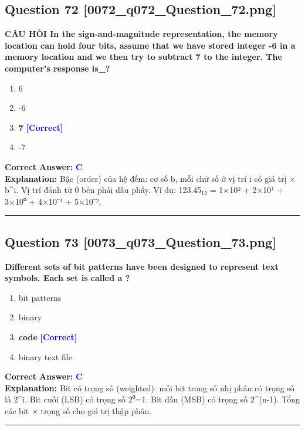 \documentclass[11pt,a4paper]{article}
\begin{document}
\begin{minipage}{\textwidth}
\subsection*{Question 72 \quad \footnotesize{[0072\_q072\_Question\_72.png]}}
\noindent \textbf{CÅU HÒI In the sign-and-magnitude representation, the memory location can hold four bits, assume that we have stored integer -6 in a memory location and we then try to subtract 7 to the integer. The computer's response is\_?}

\begin{enumerate}[label=\Alph*.]
    \item 6
    \item -6
    \item \textbf{7} \hfill \textcolor{blue}{\textbf{[Correct]}}
    \item -7
\end{enumerate}

\noindent \textbf{Correct Answer:} \textcolor{blue}{\textbf{C}} \\[2pt]
\noindent \textbf{Explanation:} Bậc (order) của hệ đếm: cơ số b, mỗi chữ số ở vị trí i có giá trị × b\textasciicircum{}i. Vị trí đánh từ 0 bên phải dấu phẩy. Ví dụ: 123.45₁₀ = 1×10² + 2×10¹ + 3×10⁰ + 4×10⁻¹ + 5×10⁻².

\par\vspace{0.3cm}
\hrule
\vspace{0.3cm}
\end{minipage}

\begin{minipage}{\textwidth}
\subsection*{Question 73 \quad \footnotesize{[0073\_q073\_Question\_73.png]}}
\noindent \textbf{Different sets of bit patterns have been designed to represent text symbols. Each set is called a ?}

\begin{enumerate}[label=\Alph*.]
    \item bit patterns
    \item binary
    \item \textbf{code} \hfill \textcolor{blue}{\textbf{[Correct]}}
    \item binary text file
\end{enumerate}

\noindent \textbf{Correct Answer:} \textcolor{blue}{\textbf{C}} \\[2pt]
\noindent \textbf{Explanation:} Bit có trọng số (weighted): mỗi bit trong số nhị phân có trọng số là 2\textasciicircum{}i. Bit cuối (LSB) có trọng số 2⁰=1. Bit đầu (MSB) có trọng số 2\textasciicircum{}(n-1). Tổng các bit × trọng số cho giá trị thập phân.

\par\vspace{0.3cm}
\hrule
\vspace{0.3cm}
\end{minipage}
\end{document}
